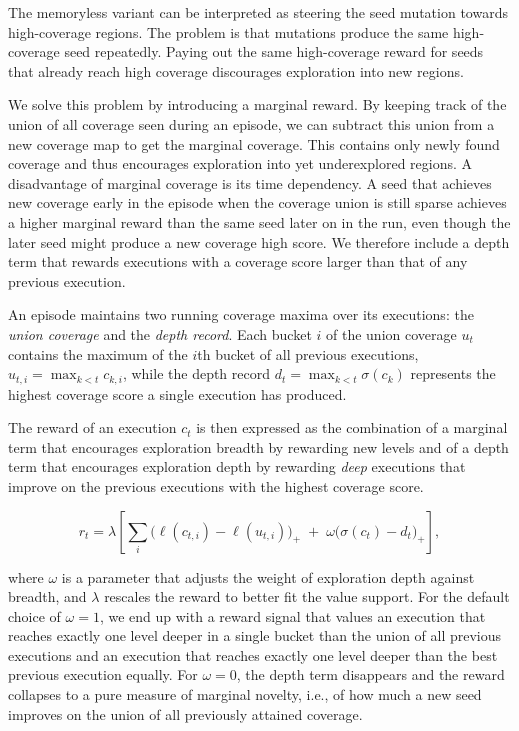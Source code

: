The memoryless variant can be interpreted as steering the seed mutation towards high-coverage
regions.
The problem is that mutations produce the same high-coverage seed repeatedly.
Paying out the same high-coverage reward for seeds that already reach high coverage
discourages exploration into new regions.

We solve this problem by introducing a marginal reward.
By keeping track of the union of all coverage seen during an episode, we can
subtract this union from a new coverage map to get the marginal coverage.
This contains only newly found coverage and thus encourages exploration into yet underexplored regions.
A disadvantage of marginal coverage is its time dependency.
A seed that achieves new coverage early in the episode when the coverage union is still sparse
achieves a higher marginal reward than the same seed later on in the run, even though
the later seed might produce a new coverage high score.
We therefore include a depth term that rewards executions with a coverage score
larger than that of any previous execution.

An episode maintains two running coverage maxima over its executions: the
\emph{union coverage} and the \emph{depth record}.
Each bucket $i$ of the union coverage $u_t$ contains the maximum of the $i$th bucket of all previous
executions, $u_{t,i}=\max_{k<t}c_{k,i}$, while the depth record $d_t=\max_{k<t}\sigma(c_k)$
represents the highest coverage score a single execution has produced.

The reward of an execution $c_t$ is then expressed as the combination of a marginal term
that encourages exploration breadth by rewarding new levels and of a depth term
that encourages exploration depth by rewarding \emph{deep} executions
that improve on the previous executions with the highest coverage score.

\begin{equation*}
  r_t=\lambda\left[\sum_i\bigl(\ell(c_{t,i})-\ell(u_{t,i})\bigr)_+
  \;+\;\omega\bigl(\sigma(c_t)-d_t\bigr)_+\right],
\end{equation*}

where $\omega$ is a parameter that adjusts the weight of exploration depth against
breadth, and $\lambda$ rescales the reward to better fit the value support.
For the default choice of $\omega=1$, we end up with a reward signal that
values an execution that reaches exactly one level deeper in a single bucket
than the union of all previous executions and an execution that reaches
exactly one level deeper than the best previous execution equally.
For $\omega=0$, the depth term disappears and the reward collapses to a pure measure
of marginal novelty, i.e., of how much a new seed improves on the union of all previously attained coverage.
